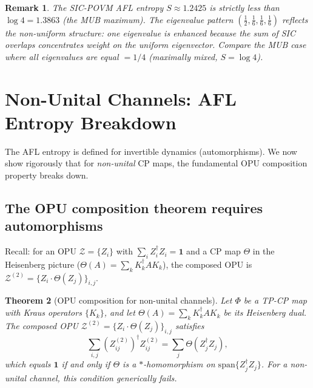 \documentclass[12pt,a4paper]{article}
\newtheorem{theorem}{Theorem}[section]
\newtheorem{remark}[theorem]{Remark}
\begin{document}
\begin{remark}
The SIC-POVM AFL entropy $S\approx 1.2425$ is strictly less than $\log 4 = 1.3863$
(the MUB maximum).  The eigenvalue pattern $(\frac{1}{2},\frac{1}{6},\frac{1}{6},\frac{1}{6})$
reflects the non-uniform structure: one eigenvalue is enhanced because the sum of
SIC overlaps concentrates weight on the uniform eigenvector.  Compare the MUB case
where all eigenvalues are equal $= 1/4$ (maximally mixed, $S = \log 4$).
\end{remark}

\section{Non-Unital Channels: AFL Entropy Breakdown}
\label{sec:nonunital}

The AFL entropy is defined for invertible dynamics (automorphisms).
We now show rigorously that for \emph{non-unital} CP maps, the fundamental
OPU composition property breaks down.

\subsection{The OPU composition theorem requires automorphisms}

Recall: for an OPU $\mathcal{Z} = \{Z_i\}$ with $\sum_i Z_i^\dagger Z_i = \mathbf{1}$
and a CP map $\Theta$ in the Heisenberg picture ($\Theta(A) = \sum_k K_k^\dagger A K_k$),
the composed OPU is $\mathcal{Z}^{(2)} = \{Z_i\cdot\Theta(Z_j)\}_{i,j}$.

\begin{theorem}[OPU composition for non-unital channels]\label{thm:opu_nonunital}
Let $\Phi$ be a TP-CP map with Kraus operators $\{K_k\}$, and let
$\Theta(A) = \sum_k K_k^\dagger A K_k$ be its Heisenberg dual.
The composed OPU $\mathcal{Z}^{(2)} = \{Z_i\cdot\Theta(Z_j)\}_{i,j}$ satisfies
\[
  \sum_{i,j}(Z^{(2)}_{ij})^\dagger Z^{(2)}_{ij}
  = \sum_j \Theta(Z_j^\dagger Z_j),
\]
which equals $\mathbf{1}$ if and only if $\Theta$ is a $*$-homomorphism on
$\mathrm{span}\{Z_j^\dagger Z_j\}$.  For a non-unital channel, this condition
generically fails.
\end{theorem}
\end{document}
